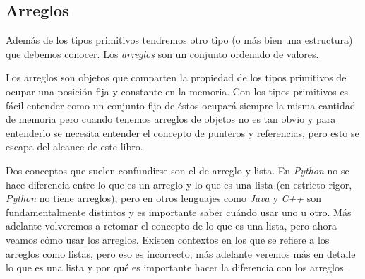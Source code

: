 \subsection{Arreglos}
  Además de los tipos primitivos tendremos otro tipo (o más bien una estructura) que debemos 
  conocer.
  Los \textit{arreglos} son un conjunto ordenado de valores.

  Los arreglos son objetos que comparten la propiedad de los tipos primitivos de ocupar una posición
  fija y constante en la memoria.
  Con los tipos primitivos es fácil entender como un conjunto fijo de éstos ocupará siempre la misma
  cantidad de memoria pero cuando tenemos arreglos de objetos no es tan obvio y para entenderlo se
  necesita entender el concepto de punteros y referencias, pero esto se escapa del alcance de este 
  libro.\autocite{java-nutshell-syntax-arrays}

  Dos conceptos que suelen confundirse son el de arreglo y lista.
  En \textit{Python} no se hace diferencia entre lo que es un arreglo y lo que es una lista (en 
  estricto rigor, \textit{Python} no tiene arreglos), pero en otros lenguajes como \textit{Java} y 
  \textit{C++} son fundamentalmente distintos y es importante saber cuándo usar uno u otro.
  Más adelante volveremos a retomar el concepto de lo que es una lista, pero ahora veamos cómo usar
  los arreglos.
  Existen contextos en los que se refiere a los arreglos como listas, pero eso es incorrecto; más
  adelante veremos más en detalle lo que es una lista y por qué es importante hacer la diferencia
  con los arreglos.